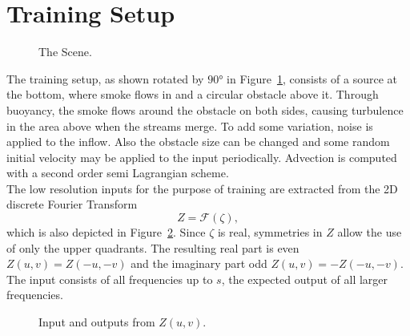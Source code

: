 \documentclass[sigconf]{acmart}
\begin{document}
\section{Training Setup}\label{sec:training}
\begin{figure}
	\caption{The Scene.}
	\label{trainingScene}
\end{figure}
The training setup, as shown rotated by $\ang{90}$ in Figure~\ref{trainingScene}, consists of a source at the bottom, where smoke flows in and a circular obstacle above it. Through buoyancy, the smoke flows around the obstacle on both sides, causing turbulence in the area above when the streams merge. To add some variation, noise is applied to the inflow. Also the obstacle size can be changed and some random initial velocity may be applied to the input periodically.
Advection is computed with a second order semi Lagrangian scheme.\\
The low resolution inputs for the purpose of training are extracted from the 2D discrete Fourier Transform 
\[
Z = \mathcal{F} (\zeta),
\]
which is also depicted in Figure~\ref{lowFreqs}.
Since $\zeta$ is real, symmetries in $Z$ allow the use of only the upper quadrants. The resulting real part is even $Z(u,v)=Z(-u,-v)$ and the imaginary part odd $Z(u,v)=-Z(-u,-v)$. The input consists of all frequencies up to $s$, the expected output of all larger frequencies.
\begin{figure}
	\caption{Input and outputs from $Z(u,v)$.}
	\label{lowFreqs}
\end{figure}
\end{document}
